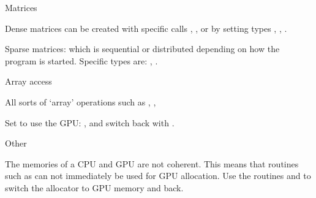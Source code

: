 {Matrices}


Dense matrices can be created with specific calls
,
,
or by setting types
,
,
.

Sparse matrices:
which is sequential or distributed
depending on how the program is started.
Specific types are:
,
.

 {Array access}

All sorts of `array' operations such as
,
,

Set  to use the GPU:
,
and switch back with
.

 {Other}
\label{sec:petsc-malloc-gpu}

The memories of a CPU and GPU are not coherent.
This means that routines such as 
can not immediately be used for GPU allocation.
Use the routines 
and 
to switch the allocator to GPU memory and back.


